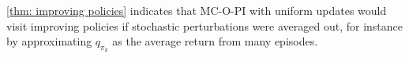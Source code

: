 \autoref{thm: improving policies} indicates that 
MC-O-PI with uniform updates would visit improving policies
if stochastic perturbations were averaged out, for instance by approximating $q_{\pi_k}$ as the average return from many episodes.


